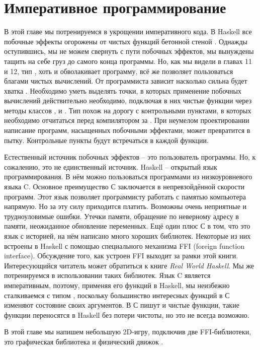 \setcounter{chapter}{19}
\chapter{Императивное программирование}

В этой главе мы потренируемся в укрощении императивного 
кода. В Haskell все побочные эффекты огорожены от
чистых функций бетонной стеной .
Однажды оступившись, мы не можем свернуть с пути побочных 
эффектов, мы вынуждены тащить на себе груз 
до самого конца программы. Но, как мы видели в главах 11 и 12,
тип  , хоть и обволакивает программу, всё же
позволяет пользоваться благами чистых вычислений.
От программиста зависит насколько сильна будет хватка .
Необходимо уметь выделять точки, в которых применение
побочных вычислений действительно необходимо, 
подключая в них чистые функции через методы классов 
,  и  .
Тип  похож на дорогу с контрольными пунктами, 
в которых необходимо отчитаться
перед компилятором за . При неумелом
проектировании написание программ, насыщенных
побочными эффектами, может превратится в пытку. 
Контрольные пункты будут встречаться в каждой функции.


Естественный источник побочных эффектов -- это пользователь программы.
Но, к сожалению, это не единственный источник. Haskell
-- открытый язык программирования. В нём можно пользоваться
программами из низкоуровневого языка C. Основное преимущество 
С заключается в непревзойдённой скорости программ. 
Этот язык позволяет программисту работать с памятью компьютера
напрямую. Но за эту силу приходится платить. 
Возможны очень неприятные и трудноуловимые ошибки. 
Утечки памяти, обращение по неверному адресу в памяти, 
неожиданное обновление переменных. Ещё один плюс С
в том, что это язык с историей, на нём написано много хороших
библиотек. Некоторые из них встроены в Haskell с помощью
специального механизма FFI (foreign function interface).
Обсуждение того, как устроен FFI выходит за рамки этой книги.
Интересующийся читатель может обратиться к книге 
\emph{Real World Haskell}. Мы же потренируемся в 
использовании таких библиотек. Язык C является императивным,
поэтому, применяя его функций в Haskell, мы неизбежно
сталкиваемся с типом , поскольку большинство
интересных функций в С изменяют состояние своих аргументов.
В С пишут и чистые функции, такие функции 
переносятся в Haskell без потери чистоты, но 
это не всегда возможно. 

В этой главе мы напишем небольшую 2D-игру, подключив
две FFI-библиотеки, это графическая библиотека 
и физический движок .

